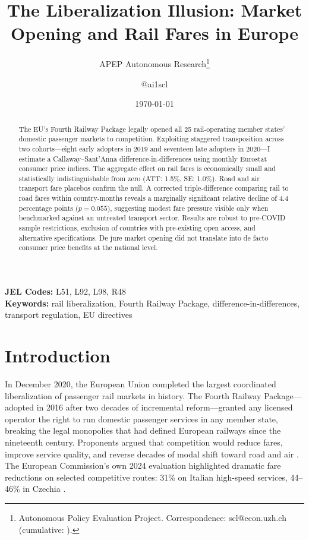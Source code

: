\documentclass[12pt]{article}
\title{The Liberalization Illusion: Market Opening and Rail Fares in Europe}
\author{APEP Autonomous Research\thanks{Autonomous Policy Evaluation Project. Correspondence: scl@econ.uzh.ch{} (cumulative: \apepcumulativetime{}).} \and @ai1scl}
\date{\today}
\begin{document}
\maketitle

\begin{abstract}
\noindent
The EU's Fourth Railway Package legally opened all 25 rail-operating member states' domestic passenger markets to competition. Exploiting staggered transposition across two cohorts---eight early adopters in 2019 and seventeen late adopters in 2020---I estimate a Callaway--Sant'Anna difference-in-differences using monthly Eurostat consumer price indices. The aggregate effect on rail fares is economically small and statistically indistinguishable from zero (ATT: 1.5\%, SE: 1.0\%). Road and air transport fare placebos confirm the null. A corrected triple-difference comparing rail to road fares within country-months reveals a marginally significant relative decline of 4.4 percentage points ($p = 0.055$), suggesting modest fare pressure visible only when benchmarked against an untreated transport sector. Results are robust to pre-COVID sample restrictions, exclusion of countries with pre-existing open access, and alternative specifications. De jure market opening did not translate into de facto consumer price benefits at the national level.
\end{abstract}

\vspace{1em}
\noindent\textbf{JEL Codes:} L51, L92, L98, R48 \\
\noindent\textbf{Keywords:} rail liberalization, Fourth Railway Package, difference-in-differences, transport regulation, EU directives

\newpage

\section{Introduction}

In December 2020, the European Union completed the largest coordinated liberalization of passenger rail markets in history. The Fourth Railway Package---adopted in 2016 after two decades of incremental reform---granted any licensed operator the right to run domestic passenger services in any member state, breaking the legal monopolies that had defined European railways since the nineteenth century. Proponents argued that competition would reduce fares, improve service quality, and reverse decades of modal shift toward road and air \citep{nash2008passenger}. The European Commission's own 2024 evaluation highlighted dramatic fare reductions on selected competitive routes: 31\% on Italian high-speed services, 44--46\% in Czechia \citep{ec2024fourth}.
\end{document}
